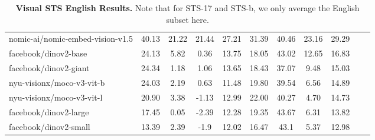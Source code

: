 \begin{table*}
{\begin{tabular}{lcccccccccc}
nomic-ai/nomic-embed-vision-v1.5 &40.13 &21.22 &21.44 &27.21 &31.39 &40.46 &23.16 &29.29 \\
facebook/dinov2-base &24.13 &5.82 &0.36 &13.75 &18.05 &43.02 &12.65 &16.83 \\
facebook/dinov2-giant &24.34 &1.18 &1.06 &13.65 &18.43 &37.07 &9.48 &15.03 \\
nyu-visionx/moco-v3-vit-b &24.03 &2.19 &0.63 &11.48 &19.80 &39.54 &6.56 &14.89 \\
nyu-visionx/moco-v3-vit-l &20.90 &3.38 &-1.13 &12.99 &22.00 &40.27 &4.70 &14.73 \\
facebook/dinov2-large &17.45 &0.05 &-2.39 &12.28 &19.35 &43.67 &6.31 &13.82 \\
facebook/dinov2-small &13.39 &2.39 &-1.9 &12.02 &16.47 &43.1 &5.37 &12.98 \\
\bottomrule
\end{tabular}}
\caption{\textbf{Visual STS English Results.} Note that for STS-17 and STS-b, we only average the English subset here.}
\label{tab: sts eng}
\end{table*}